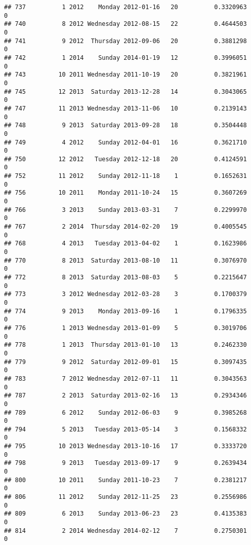 \documentclass[
]{article}
\begin{document}
\begin{verbatim}
## 737          1 2012    Monday 2012-01-16   20          0.3320963             0
## 740          8 2012 Wednesday 2012-08-15   22          0.4644503             0
## 741          9 2012  Thursday 2012-09-06   20          0.3881298             0
## 742          1 2014    Sunday 2014-01-19   12          0.3996051             0
## 743         10 2011 Wednesday 2011-10-19   20          0.3821961             0
## 745         12 2013  Saturday 2013-12-28   14          0.3043065             0
## 747         11 2013 Wednesday 2013-11-06   10          0.2139143             0
## 748          9 2013  Saturday 2013-09-28   18          0.3504448             0
## 749          4 2012    Sunday 2012-04-01   16          0.3621710             0
## 750         12 2012   Tuesday 2012-12-18   20          0.4124591             0
## 752         11 2012    Sunday 2012-11-18    1          0.1652631             0
## 756         10 2011    Monday 2011-10-24   15          0.3607269             0
## 766          3 2013    Sunday 2013-03-31    7          0.2299970             0
## 767          2 2014  Thursday 2014-02-20   19          0.4005545             0
## 768          4 2013   Tuesday 2013-04-02    1          0.1623986             0
## 770          8 2013  Saturday 2013-08-10   11          0.3076970             0
## 772          8 2013  Saturday 2013-08-03    5          0.2215647             0
## 773          3 2012 Wednesday 2012-03-28    3          0.1700379             0
## 774          9 2013    Monday 2013-09-16    1          0.1796335             0
## 776          1 2013 Wednesday 2013-01-09    5          0.3019706             0
## 778          1 2013  Thursday 2013-01-10   13          0.2462330             0
## 779          9 2012  Saturday 2012-09-01   15          0.3097435             0
## 783          7 2012 Wednesday 2012-07-11   11          0.3043563             0
## 787          2 2013  Saturday 2013-02-16   13          0.2934346             0
## 789          6 2012    Sunday 2012-06-03    9          0.3985268             0
## 794          5 2013   Tuesday 2013-05-14    3          0.1568332             0
## 795         10 2013 Wednesday 2013-10-16   17          0.3333720             0
## 798          9 2013   Tuesday 2013-09-17    9          0.2639434             0
## 800         10 2011    Sunday 2011-10-23    7          0.2381217             0
## 806         11 2012    Sunday 2012-11-25   23          0.2556986             0
## 809          6 2013    Sunday 2013-06-23   23          0.4135383             0
## 814          2 2014 Wednesday 2014-02-12    7          0.2750301             0

\end{verbatim}
\end{document}
